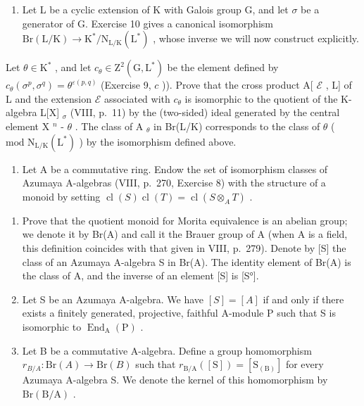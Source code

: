 \begin{enumerate}
\def\labelenumi{\arabic{enumi})}
\setcounter{enumi}{10}
\tightlist
\item
  Let L be a cyclic extension of K with Galois group G, and let \(\sigma\) be a generator of G. Exercise 10 gives a canonical isomorphism \(\mathrm{Br}(\mathrm{L}/\mathrm{K}) \to \mathrm{K}^{*}/\mathrm{N}_{\mathrm{L}/\mathrm{K}}(\mathrm{L}^{*})\) , whose inverse we will now construct explicitly.
\end{enumerate}

Let \(\theta \in \mathrm{K}^*\) , and let \(c_{\theta} \in \mathrm{Z}^{2}(\mathrm{G}, \mathrm{L}^{*})\) be the element defined by \(c_{\theta}(\sigma^{p}, \sigma^{q}) = \theta^{\varepsilon(p,q)}\) (Exercise 9, \(c\) )). Prove that the cross product A{[} \(\mathcal{E}\) , L{]} of L and the extension \(\mathcal{E}\) associated with \(c_{\theta}\) is isomorphic to the quotient of the K-algebra L{[}X{]} \(_{\sigma}\) (VIII, p.~11) by the (two-sided) ideal generated by the central element X \(^{n}\) - \(\theta\) . The class of A \(_{\theta}\) in Br(L/K) corresponds to the class of \(\theta\) ( \(\text{mod } \mathrm{N}_{\mathrm{L/K}}(\mathrm{L}^{*})\) ) by the isomorphism defined above.

\begin{enumerate}
\def\labelenumi{\arabic{enumi})}
\setcounter{enumi}{11}
\tightlist
\item
  Let A be a commutative ring. Endow the set of isomorphism classes of Azumaya A-algebras (VIII, p.~270, Exercise 8) with the structure of a monoid by setting \(\operatorname{cl}(S)\operatorname{cl}(T)=\operatorname{cl}(S\otimes_{A}T)\) .
\end{enumerate}

\begin{enumerate}
\def\labelenumi{\alph{enumi})}
\item
  Prove that the quotient monoid for Morita equivalence is an abelian group; we denote it by Br(A) and call it the Brauer group of A (when A is a field, this definition coincides with that given in VIII, p.~279). Denote by {[}S{]} the class of an Azumaya A-algebra S in Br(A). The identity element of Br(A) is the class of A, and the inverse of an element {[}S{]} is {[}S°{]}.
\item
  Let S be an Azumaya A-algebra. We have \([S] = [A]\) if and only if there exists a finitely generated, projective, faithful A-module P such that S is isomorphic to \(\operatorname{End}_{\mathrm{A}}(\mathrm{P})\) .
\item
  Let B be a commutative A-algebra. Define a group homomorphism \(r_{B/A} : \mathrm{Br}(A) \to \mathrm{Br}(B)\) such that \(r_{\mathrm{B/A}}([\mathrm{S}]) = [\mathrm{S}_{(\mathrm{B})}]\) for every Azumaya A-algebra S. We denote the kernel of this homomorphism by \(\mathrm{Br(B/A)}\) .
\end{enumerate}

